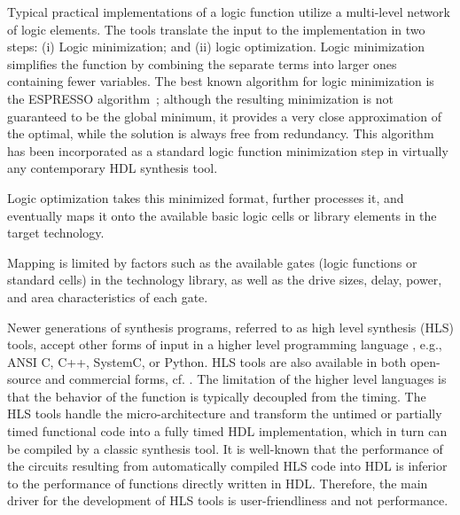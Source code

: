 Typical practical implementations of a logic function utilize a multi-level network of logic elements.
The tools translate the input to the implementation in two steps: (i) Logic minimization; and (ii) logic optimization.
Logic minimization simplifies the function by combining the separate terms into larger ones containing fewer variables.
The best known algorithm for logic minimization is the ESPRESSO algorithm~\cite{brayton1984logic}; although the resulting minimization is not guaranteed to be the global minimum, it provides a very close approximation of the optimal, while the solution is always free from redundancy.
This algorithm has been incorporated as a standard logic function minimization step in virtually any contemporary HDL synthesis tool.

Logic optimization takes this minimized format, further processes it, and eventually maps it onto the available basic logic cells or library elements in the target technology.

Mapping is limited by factors such as the available gates (logic functions or standard cells) in the technology library, as well as the drive sizes, delay, power, and area characteristics of each gate.

Newer generations of synthesis programs, referred to as high level synthesis (HLS) tools, accept other forms of input in a higher level programming language \cite{Chapter:Zhang2008,chu1989hyper,corazao1996performance}, e.g., ANSI C, C++, SystemC, or Python.
HLS tools are also available in both open-source and commercial forms, cf. \cite{tool:Vivado,decaluwe2004myhdl,tool:PandA}.
The limitation of the higher level languages is that the behavior of the function is typically decoupled from the timing.
The HLS tools handle the micro-architecture and transform the untimed or partially timed functional code into a fully timed HDL implementation, which in turn can be compiled by a classic synthesis tool.
It is well-known that the performance of the circuits resulting from automatically compiled HLS code into HDL is inferior to the performance of functions directly written in HDL.
Therefore, the main driver for the development of HLS tools is user-friendliness and not performance.

